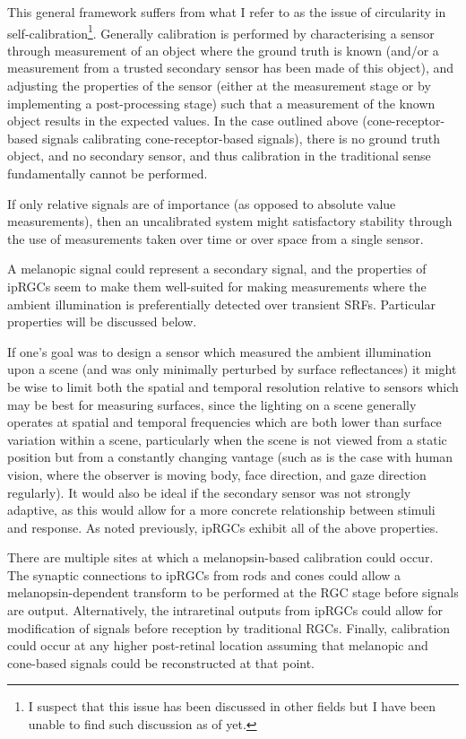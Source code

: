 This general framework suffers from what I refer to as the issue of circularity in self-calibration\footnote{I suspect that this issue has been discussed in other fields but I have been unable to find such discussion as of yet.}. Generally calibration is performed by characterising a sensor through measurement of an object where the ground truth is known (and/or a measurement from a trusted secondary sensor has been made of this object), and adjusting the properties of the sensor (either at the measurement stage or by implementing a post-processing stage) such that a measurement of the known object results in the expected values. In the case outlined above (cone-receptor-based signals calibrating cone-receptor-based signals), there is no ground truth object, and no secondary sensor, and thus calibration in the traditional sense fundamentally cannot be performed.

If only relative signals are of importance (as opposed to absolute value measurements), then an uncalibrated system might satisfactory stability through the use of measurements taken over time or over space from a single sensor.

A melanopic signal could represent a secondary signal, and the properties of \glspl{ipRGC} seem to make them well-suited for making measurements where the ambient illumination is preferentially detected over transient \glspl{SRF}. Particular properties will be discussed below.

If one's goal was to design a sensor which measured the ambient illumination upon a scene (and was only minimally perturbed by surface reflectances) it might be wise to limit both the spatial and temporal resolution relative to sensors which may be best for measuring surfaces, since the lighting on a scene generally operates at spatial and temporal frequencies which are both lower than surface variation within a scene, particularly when the scene is not viewed from a static position but from a constantly changing vantage (such as is the case with human vision, where the observer is moving body, face direction, and gaze direction regularly). It would also be ideal if the secondary sensor was not strongly adaptive, as this would allow for a more concrete relationship between stimuli and response. As noted previously, \glspl{ipRGC} exhibit all of the above properties.

There are multiple sites at which a melanopsin-based calibration could occur. The synaptic connections to \glspl{ipRGC} from rods and cones could allow a melanopsin-dependent transform to be performed at the \gls{RGC} stage before signals are output. Alternatively, the intraretinal outputs from \glspl{ipRGC} could allow for modification of signals before reception by traditional \glspl{RGC}. Finally, calibration could occur at any higher post-retinal location assuming that melanopic and cone-based signals could be reconstructed at that point.





\clearpage


